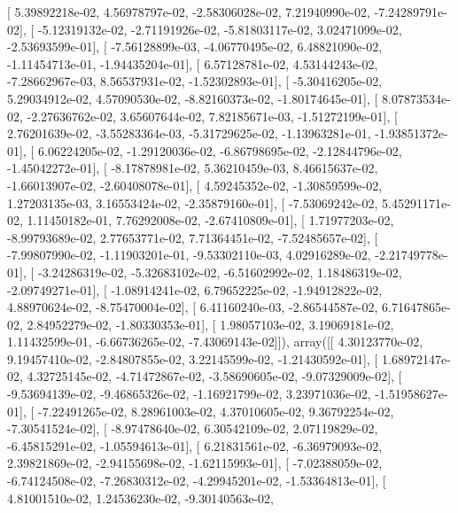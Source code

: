 \documentclass{article}
\begin{document}
       [  5.39892218e-02,   4.56978797e-02,  -2.58306028e-02,
          7.21940990e-02,  -7.24289791e-02],
       [ -5.12319132e-02,  -2.71191926e-02,  -5.81803117e-02,
          3.02471099e-02,  -2.53693599e-01],
       [ -7.56128899e-03,  -4.06770495e-02,   6.48821090e-02,
         -1.11454713e-01,  -1.94435204e-01],
       [  6.57128781e-02,   4.53144243e-02,  -7.28662967e-03,
          8.56537931e-02,  -1.52302893e-01],
       [ -5.30416205e-02,   5.29034912e-02,   4.57090530e-02,
         -8.82160373e-02,  -1.80174645e-01],
       [  8.07873534e-02,  -2.27636762e-02,   3.65607644e-02,
          7.82185671e-03,  -1.51272199e-01],
       [  2.76201639e-02,  -3.55283364e-03,  -5.31729625e-02,
         -1.13963281e-01,  -1.93851372e-01],
       [  6.06224205e-02,  -1.29120036e-02,  -6.86798695e-02,
         -2.12844796e-02,  -1.45042272e-01],
       [ -8.17878981e-02,   5.36210459e-03,   8.46615637e-02,
         -1.66013907e-02,  -2.60408078e-01],
       [  4.59245352e-02,  -1.30859599e-02,   1.27203135e-03,
          3.16553424e-02,  -2.35879160e-01],
       [ -7.53069242e-02,   5.45291171e-02,   1.11450182e-01,
          7.76292008e-02,  -2.67410809e-01],
       [  1.71977203e-02,  -8.99793689e-02,   2.77653771e-02,
          7.71364451e-02,  -7.52485657e-02],
       [ -7.99807990e-02,  -1.11903201e-01,  -9.53302110e-03,
          4.02916289e-02,  -2.21749778e-01],
       [ -3.24286319e-02,  -5.32683102e-02,  -6.51602992e-02,
          1.18486319e-02,  -2.09749271e-01],
       [ -1.08914241e-02,   6.79652225e-02,  -1.94912822e-02,
          4.88970624e-02,  -8.75470004e-02],
       [  6.41160240e-03,  -2.86544587e-02,   6.71647865e-02,
          2.84952279e-02,  -1.80330353e-01],
       [  1.98057103e-02,   3.19069181e-02,   1.11432599e-01,
         -6.66736265e-02,  -7.43069143e-02]]), array([[  4.30123770e-02,   9.19457410e-02,  -2.84807855e-02,
          3.22145599e-02,  -1.21430592e-01],
       [  1.68972147e-02,   4.32725145e-02,  -4.71472867e-02,
         -3.58690605e-02,  -9.07329009e-02],
       [ -9.53694139e-02,  -9.46865326e-02,  -1.16921799e-02,
          3.23971036e-02,  -1.51958627e-01],
       [ -7.22491265e-02,   8.28961003e-02,   4.37010605e-02,
          9.36792254e-02,  -7.30541524e-02],
       [ -8.97478640e-02,   6.30542109e-02,   2.07119829e-02,
         -6.45815291e-02,  -1.05594613e-01],
       [  6.21831561e-02,  -6.36979093e-02,   2.39821869e-02,
         -2.94155698e-02,  -1.62115993e-01],
       [ -7.02388059e-02,  -6.74124508e-02,  -7.26830312e-02,
         -4.29945201e-02,  -1.53364813e-01],
       [  4.81001510e-02,   1.24536230e-02,  -9.30140563e-02,
\end{document}
